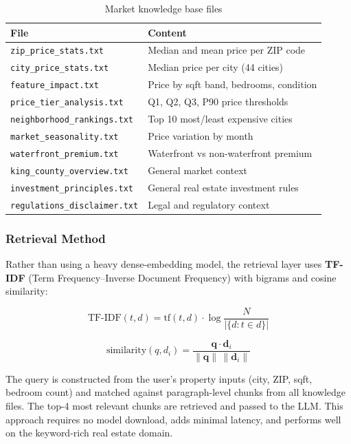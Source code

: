 \documentclass[12pt, a4paper]{article}
\begin{document}
\begin{table}[H]
\centering
\caption{Market knowledge base files}
\begin{tabular}{ll}
  \toprule
  \textbf{File}                  & \textbf{Content} \\
  \midrule
  \texttt{zip\_price\_stats.txt}       & Median and mean price per ZIP code \\
  \texttt{city\_price\_stats.txt}      & Median price per city (44 cities) \\
  \texttt{feature\_impact.txt}         & Price by sqft band, bedrooms, condition \\
  \texttt{price\_tier\_analysis.txt}   & Q1, Q2, Q3, P90 price thresholds \\
  \texttt{neighborhood\_rankings.txt}  & Top 10 most/least expensive cities \\
  \texttt{market\_seasonality.txt}     & Price variation by month \\
  \texttt{waterfront\_premium.txt}     & Waterfront vs non-waterfront premium \\
  \texttt{king\_county\_overview.txt}  & General market context \\
  \texttt{investment\_principles.txt}  & General real estate investment rules \\
  \texttt{regulations\_disclaimer.txt} & Legal and regulatory context \\
  \bottomrule
\end{tabular}
\end{table}

\subsubsection{Retrieval Method}
Rather than using a heavy dense-embedding model, the retrieval layer uses
\textbf{TF-IDF} (Term Frequency--Inverse Document Frequency) with bigrams and
cosine similarity:

\[
  \text{TF-IDF}(t, d) = \text{tf}(t,d) \cdot \log\frac{N}{|\{d : t \in d\}|}
\]

\[
  \text{similarity}(q, d_i) = \frac{\mathbf{q} \cdot \mathbf{d}_i}{\|\mathbf{q}\|\,\|\mathbf{d}_i\|}
\]

The query is constructed from the user's property inputs (city, ZIP, sqft, bedroom
count) and matched against paragraph-level chunks from all knowledge files. The
top-4 most relevant chunks are retrieved and passed to the LLM. This approach
requires no model download, adds minimal latency, and performs well on the
keyword-rich real estate domain.
\end{document}

